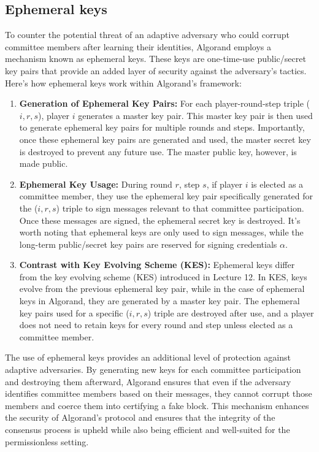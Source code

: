 \documentclass{report}
\begin{document}
\subsection{Ephemeral keys}
To counter the potential threat of an adaptive adversary who could corrupt committee members after learning their identities, Algorand employs a mechanism known as ephemeral keys. These keys are one-time-use public/secret key pairs that provide an added layer of security against the adversary's tactics.\\
Here's how ephemeral keys work within Algorand's framework:
\begin{enumerate}
	\item \textbf{Generation of Ephemeral Key Pairs:} For each player-round-step triple ($i, r, s$), player $i$ generates a master key pair. This master key pair is then used to generate ephemeral key pairs for multiple rounds and steps. Importantly, once these ephemeral key pairs are generated and used, the master secret key is destroyed to prevent any future use. The master public key, however, is made public.
	\item \textbf{Ephemeral Key Usage:} During round $r$, step $s$, if player $i$ is elected as a committee member, they use the ephemeral key pair specifically generated for the ($i, r, s$) triple to sign messages relevant to that committee participation. Once these messages are signed, the ephemeral secret key is destroyed. It's worth noting that ephemeral keys are only used to sign messages, while the long-term public/secret key pairs are reserved for signing credentials $\alpha$.
	\item \textbf{Contrast with Key Evolving Scheme (KES):} Ephemeral keys differ from the key evolving scheme (KES) introduced in Lecture 12. In KES, keys evolve from the previous ephemeral key pair, while in the case of ephemeral keys in Algorand, they are generated by a master key pair. The ephemeral key pairs used for a specific ($i, r, s$) triple are destroyed after use, and a player does not need to retain keys for every round and step unless elected as a committee member.
\end{enumerate}
The use of ephemeral keys provides an additional level of protection against adaptive adversaries. By generating new keys for each committee participation and destroying them afterward, Algorand ensures that even if the adversary identifies committee members based on their messages, they cannot corrupt those members and coerce them into certifying a fake block. This mechanism enhances the security of Algorand's protocol and ensures that the integrity of the consensus process is upheld while also being efficient and well-suited for the permissionless setting.
\end{document}
